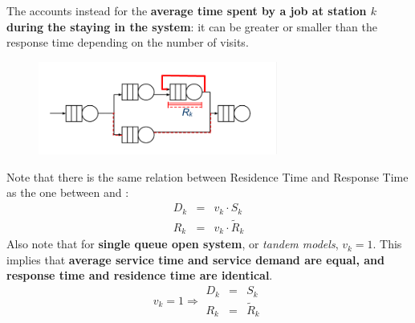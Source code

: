 \noindent
The  accounts instead for the \textbf{average time spent by a job at station $k$ during the staying in the system}: it can be greater or smaller than the response time depending on the number of visits.
\begin{figure}[!htp]
	\centering
	\includegraphics[width=0.7\textwidth]{img/residence-time.png}
\end{figure}

\noindent
Note that there is the same relation between Residence Time and Response Time as the one between  and :
\begin{equation}
	\begin{array}{rcl}
		D_{k} &=& v_{k} \cdot S_{k} \\ [.3em]
		R_{k} &=& v_{k} \cdot \tilde{R}_{k}
	\end{array}
\end{equation}
Also note that for \textbf{single queue open system}, or \emph{tandem models}, $v_{k} = 1$. This implies that \textbf{average service time and service demand are equal, and response time and residence time are identical}.
\begin{equation*}
	v_{k} = 1 \Rightarrow
	\begin{array}{rcl}
		D_{k} &=& S_{k} \\ [.3em]
		R_{k} &=& \tilde{R}_{k}
	\end{array}
\end{equation*}